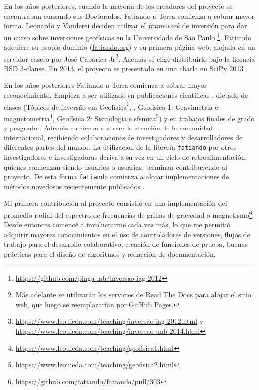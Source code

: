 En los años posteriores, cuando la mayoría de los creadores del proyecto se
encontraban cursando sus Doctorados, Fatiando a Terra comienza a cobrar mayor
forma.
Leonardo y Vanderei deciden utilizar el \emph{framework} de inversión para dar
un curso sobre inversiones geofísicas en la Universidade de São Paulo%
\footnote{\url{https://github.com/pinga-lab/inversao-iag-2012}}.
Fatiando adquiere su propio dominio
(\href{https://www.fatiando.org}{fatiando.org}) y su primera página web,
alojada en un servidor casero por José Caparica Jr\footnote{%
    Más adelante se utilizarán los servicios de
    \href{https://readthedocs.org/}{Read The Docs} para alojar el sitio web,
    que luego se reemplazarían por GitHub Pages.
}.
Además se elige distribuirlo bajo la licencia
\href{https://opensource.org/licenses/BSD-3-Clause}{BSD 3-clause}.
En 2013, el proyecto es presentado en una charla en SciPy 2013
\citep{uieda2013}.

En los años posteriores Fatiando a Terra comienza a cobrar mayor
reconocimiento. Empieza a ser utilizado en publicaciones científicas
\citep[][entre otros]{%
    uieda2012,
    carlos2014,
    oliveira2015,
    hidalgogato2015,
    carlos2016,
    reis2016,
    uieda2017,
    hidalgogato2017,
    siqueira2017%
},
dictado de clases
(Tópicos de inversão em
Geofísica\footnote{%
    \url{https://www.leouieda.com/teaching/inversao-iag-2012.html}
    y \url{https://www.leouieda.com/teaching/inversao-unb-2014.html}
},
\citet{uieda2014},
Geofísica 1: Gravimetria e magnetometria\footnote{%
    \url{https://www.leouieda.com/teaching/geofisica1.html}
},
Geofísica 2: Sismologia e sísmica\footnote{%
    \url{https://www.leouieda.com/teaching/geofisica2.html}
})
y en trabajos finales de grado y posgrado
\citep{carlos2013, sales2014, soler2015, uieda2016b, melo2020}.
Además comienza a atraer la atención de la comunidad internacional, recibiendo
colaboraciones de investigadores y desarrolladores de diferentes partes del
mundo.
La utilización de la librería \texttt{fatiando} por otros investigadores
e investigadoras deriva a su vez en un ciclo de retroalimentación: quienes
comienzan siendo usuarios o usuarias, terminan contribuyendo al proyecto.
De esta forma \texttt{fatiando} comienza a alojar implementaciones de métodos
novedosos recientemente publicados \citep{uieda2012b, oliveira2013}.

Mi primera contribución al proyecto consistió en una implementación del promedio
radial del espectro de frecuencias de grillas de gravedad
o magnetismo\footnote{%
    \url{https://github.com/fatiando/fatiando/pull/303}
}.
Desde entonces comencé a involucrarme cada vez más, lo que me permitió adquirir
mayores conocimientos en el uso de controladores de versiones, flujos de
trabajo para el desarrollo colaborativo, creación de funciones de
prueba, buenas prácticas para el diseño de algoritmos y redacción de
documentación.

